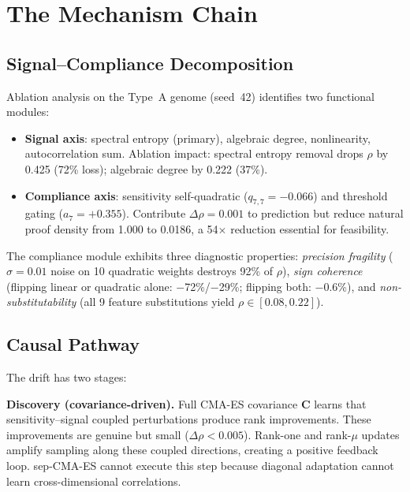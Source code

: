 \documentclass[twoside]{article}
\newcommand{\bC}{\mathbf{C}}
\begin{document}
\section{The Mechanism Chain}
\label{sec:mechanism}

\subsection{Signal--Compliance Decomposition}

Ablation analysis on the Type~A genome (seed~42) identifies two functional modules:

\begin{itemize}
\item \textbf{Signal axis}: spectral entropy (primary), algebraic degree,
  nonlinearity, autocorrelation sum. Ablation impact: spectral entropy removal
  drops $\rho$ by 0.425 (72\% loss); algebraic degree by 0.222 (37\%).

\item \textbf{Compliance axis}: sensitivity self-quadratic ($q_{7,7} = -0.066$)
  and threshold gating ($a_7 = +0.355$). Contribute $\Delta\rho = 0.001$ to
  prediction but reduce natural proof density from 1.000 to 0.0186, a
  54$\times$ reduction essential for feasibility.
\end{itemize}

The compliance module exhibits three diagnostic properties: \emph{precision
fragility} ($\sigma = 0.01$ noise on 10 quadratic weights destroys 92\% of
$\rho$), \emph{sign coherence} (flipping linear or quadratic alone:
$-$72\%/$-$29\%; flipping both: $-$0.6\%), and \emph{non-substitutability}
(all 9 feature substitutions yield $\rho \in [0.08, 0.22]$).

\subsection{Causal Pathway}

The drift has two stages:

\textbf{Discovery (covariance-driven).} Full CMA-ES covariance $\bC$ learns
that sensitivity--signal coupled perturbations produce rank improvements. These
improvements are genuine but small ($\Delta\rho < 0.005$). Rank-one and
rank-$\mu$ updates amplify sampling along these coupled directions, creating a
positive feedback loop. sep-CMA-ES cannot execute this step because diagonal
adaptation cannot learn cross-dimensional correlations.
\end{document}
